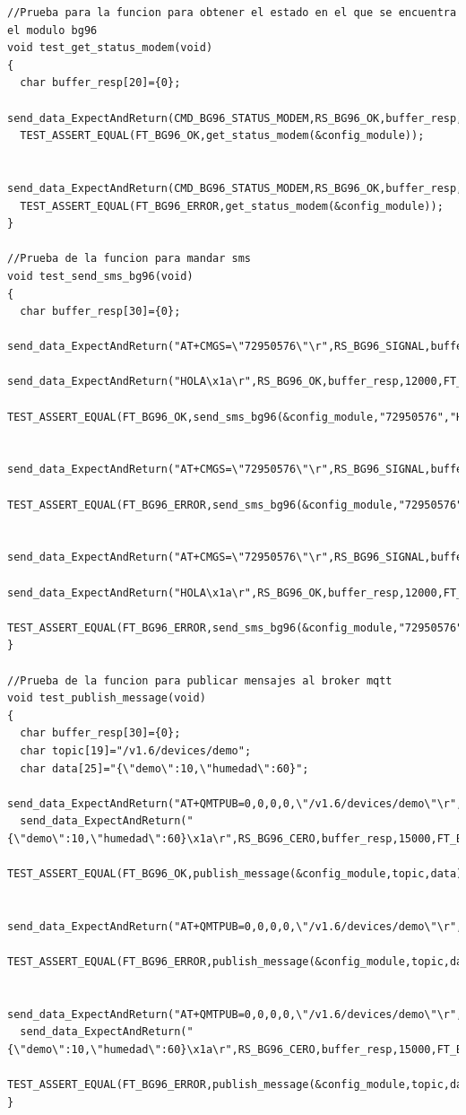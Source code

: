 \begin{lstlisting}[label=cod:codigo test driver bg96,caption=Tests del driver modulo bg96.] 
//Prueba para la funcion para obtener el estado en el que se encuentra el modulo bg96
void test_get_status_modem(void)
{
  char buffer_resp[20]={0};
  send_data_ExpectAndReturn(CMD_BG96_STATUS_MODEM,RS_BG96_OK,buffer_resp,1000,FT_BG96_OK);
  TEST_ASSERT_EQUAL(FT_BG96_OK,get_status_modem(&config_module));

  send_data_ExpectAndReturn(CMD_BG96_STATUS_MODEM,RS_BG96_OK,buffer_resp,1000,FT_BG96_ERROR);
  TEST_ASSERT_EQUAL(FT_BG96_ERROR,get_status_modem(&config_module));
}

//Prueba de la funcion para mandar sms  
void test_send_sms_bg96(void)
{
  char buffer_resp[30]={0};
  send_data_ExpectAndReturn("AT+CMGS=\"72950576\"\r",RS_BG96_SIGNAL,buffer_resp,12000,FT_BG96_OK);
  send_data_ExpectAndReturn("HOLA\x1a\r",RS_BG96_OK,buffer_resp,12000,FT_BG96_OK);
  TEST_ASSERT_EQUAL(FT_BG96_OK,send_sms_bg96(&config_module,"72950576","HOLA"));

  send_data_ExpectAndReturn("AT+CMGS=\"72950576\"\r",RS_BG96_SIGNAL,buffer_resp,12000,FT_BG96_ERROR);
  TEST_ASSERT_EQUAL(FT_BG96_ERROR,send_sms_bg96(&config_module,"72950576","HOLA"));

  send_data_ExpectAndReturn("AT+CMGS=\"72950576\"\r",RS_BG96_SIGNAL,buffer_resp,12000,FT_BG96_OK);
  send_data_ExpectAndReturn("HOLA\x1a\r",RS_BG96_OK,buffer_resp,12000,FT_BG96_ERROR);
  TEST_ASSERT_EQUAL(FT_BG96_ERROR,send_sms_bg96(&config_module,"72950576","HOLA"));
}

//Prueba de la funcion para publicar mensajes al broker mqtt
void test_publish_message(void)
{
  char buffer_resp[30]={0};
  char topic[19]="/v1.6/devices/demo";
  char data[25]="{\"demo\":10,\"humedad\":60}";
  send_data_ExpectAndReturn("AT+QMTPUB=0,0,0,0,\"/v1.6/devices/demo\"\r",RS_BG96_SIGNAL,buffer_resp,3000,FT_BG96_OK);
  send_data_ExpectAndReturn("{\"demo\":10,\"humedad\":60}\x1a\r",RS_BG96_CERO,buffer_resp,15000,FT_BG96_OK);
  TEST_ASSERT_EQUAL(FT_BG96_OK,publish_message(&config_module,topic,data));

  send_data_ExpectAndReturn("AT+QMTPUB=0,0,0,0,\"/v1.6/devices/demo\"\r",RS_BG96_SIGNAL,buffer_resp,3000,FT_BG96_ERROR);
  TEST_ASSERT_EQUAL(FT_BG96_ERROR,publish_message(&config_module,topic,data));

  send_data_ExpectAndReturn("AT+QMTPUB=0,0,0,0,\"/v1.6/devices/demo\"\r",RS_BG96_SIGNAL,buffer_resp,3000,FT_BG96_OK);
  send_data_ExpectAndReturn("{\"demo\":10,\"humedad\":60}\x1a\r",RS_BG96_CERO,buffer_resp,15000,FT_BG96_ERROR);
  TEST_ASSERT_EQUAL(FT_BG96_ERROR,publish_message(&config_module,topic,data));
}
\end{lstlisting}

